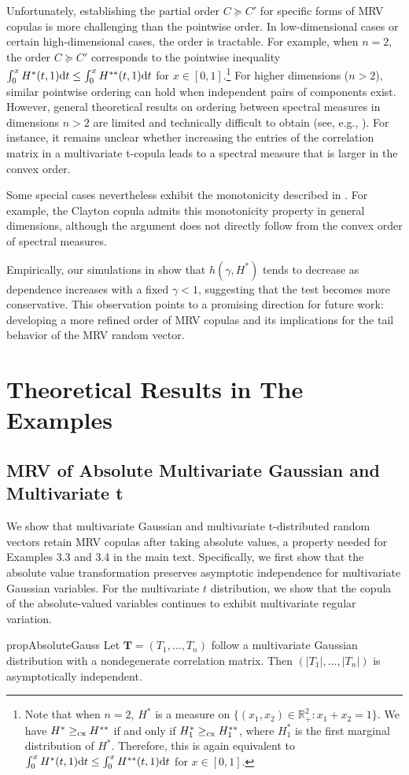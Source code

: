 \documentclass[12pt]{article}
\theoremstyle{plain}
\theoremstyle{plain}
\theoremstyle{definition}
\newcommand{\R}{\mathbb{R}}
\begin{document}
Unfortunately, establishing the partial order $C\succeq C'$ for specific forms of MRV copulas is more challenging than the pointwise order. In low-dimensional cases or certain high-dimensional cases, the order is tractable. For example, when $n = 2$, the order $C \succeq C'$  corresponds to the pointwise inequality $\int_0^x H^*(t,1){\rm d}t\le \int_0^x H^{**}(t,1) {\rm d}t$ for $x\in [0,1]$.\footnote{Note that when $n=2$, $H^*$ is a measure on $\{(x_1,x_2)\in\R_+^2: x_1+x_2=1\}$. We have $H^*\ge_{\rm cx}  H^{**}$  if and only if  $H_1^*\ge_{\rm cx}  H_1^{**}$, where $H_1^*$ is the first marginal distribution of $H^*$. Therefore, this is again equivalent to $\int_0^x H^*(t,1){\rm d}t\le \int_0^x H^{**}(t,1) {\rm d}t$ for $x\in [0,1]$.} 
For higher dimensions ($n > 2$), similar pointwise ordering can hold when independent pairs of components exist. However, general theoretical results on ordering between spectral measures in dimensions $n > 2$ are limited and technically difficult to obtain (see, e.g., ). For instance, it remains unclear whether increasing the entries of the correlation matrix in a multivariate t-copula leads to a spectral measure that is larger in the convex order.

Some special cases nevertheless exhibit the monotonicity described in . For example, the Clayton copula admits this monotonicity property in general dimensions, although the argument does not directly follow from the convex order of spectral measures.

Empirically, our simulations in  show that $h(\gamma,H^*)$ tends to decrease as dependence increases with a fixed $\gamma < 1$, suggesting that the test becomes more conservative. This observation points to a promising direction for future work: developing a more refined order of MRV copulas and its implications for the tail behavior of the MRV random vector.

\section{Theoretical Results in The Examples}

\subsection{MRV of Absolute Multivariate Gaussian and Multivariate t}
We show that multivariate Gaussian and multivariate t-distributed random vectors retain MRV copulas after taking absolute values, a property needed for Examples 3.3 and 3.4 in the main text.
Specifically, we first show that the absolute value transformation preserves asymptotic independence for multivariate Gaussian variables. For the multivariate $t$ distribution, we show that the copula of the absolute-valued variables continues to exhibit multivariate regular variation.
\begin{restatable}{prop}{AbsoluteGauss}
\label{prop:abs-preserve-independence}
Let $\mathbf{T}=(T_1,\dots,T_n)$ follow a multivariate Gaussian distribution with a nondegenerate correlation matrix. Then $(|T_1|,\dots,|T_n|)$ is asymptotically independent.
\end{restatable}
\end{document}
